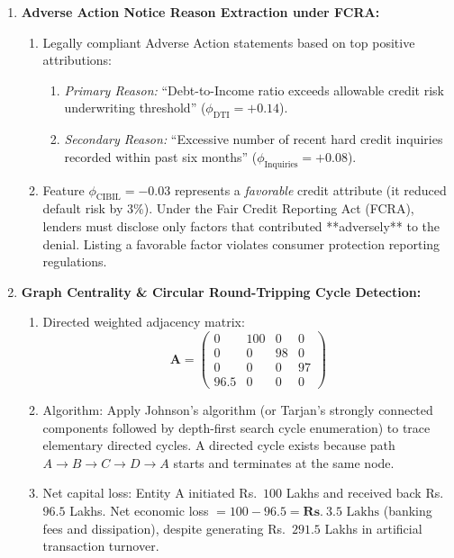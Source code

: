 \begin{enumerate}[label=\textbf{P12.\arabic*}]
    \item \textbf{Adverse Action Notice Reason Extraction under FCRA:}
    \begin{enumerate}[label=(\alph*)]
        \item Legally compliant Adverse Action statements based on top positive attributions:
        \begin{enumerate}
            \item \textit{Primary Reason:} ``Debt-to-Income ratio exceeds allowable credit risk underwriting threshold'' ($\phi_{\text{DTI}} = +0.14$).
            \item \textit{Secondary Reason:} ``Excessive number of recent hard credit inquiries recorded within past six months'' ($\phi_{\text{Inquiries}} = +0.08$).
        \end{enumerate}
        \item Feature $\phi_{\text{CIBIL}} = -0.03$ represents a \textit{favorable} credit attribute (it reduced default risk by $3\%$). Under the Fair Credit Reporting Act (FCRA), lenders must disclose only factors that contributed **adversely** to the denial. Listing a favorable factor violates consumer protection reporting regulations.
    \end{enumerate}

    \item \textbf{Graph Centrality \& Circular Round-Tripping Cycle Detection:}
    \begin{enumerate}[label=(\alph*)]
        \item Directed weighted adjacency matrix:
        \begin{equation*}
        \mathbf{A} = \begin{pmatrix}
        0 & 100 & 0 & 0 \\
        0 & 0 & 98 & 0 \\
        0 & 0 & 0 & 97 \\
        96.5 & 0 & 0 & 0
        \end{pmatrix}
        \end{equation*}
        \item Algorithm: Apply Johnson's algorithm (or Tarjan's strongly connected components followed by depth-first search cycle enumeration) to trace elementary directed cycles. A directed cycle exists because path $A \to B \to C \to D \to A$ starts and terminates at the same node.
        \item Net capital loss: Entity A initiated Rs.~$100$ Lakhs and received back Rs.~$96.5$ Lakhs. Net economic loss $= 100 - 96.5 = \mathbf{Rs.~} 3.5\text{ Lakhs}$ (banking fees and dissipation), despite generating Rs.~$291.5$ Lakhs in artificial transaction turnover.
    \end{enumerate}


\end{enumerate}

